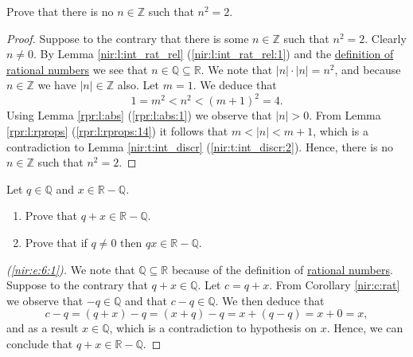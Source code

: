 \Newpage
\begin{exercise} %
	Prove that there is no $n \in \mathbb{Z}$ such that $n^{2} = 2$.
\end{exercise}

\begin{proof}
	Suppose to the contrary that there is some $n \in \mathbb{Z}$ such that $n^2 = 2$. Clearly $n \neq 0$. By Lemma \ref{nir:l:int_rat_rel} (\ref{nir:l:int_rat_rel:1}) and the \hyperref[nir:d:rat_irrat]{definition of rational numbers} we see that $n \in \mathbb{Q} \subseteq \mathbb{R}$. We note that $|n| \cdot |n| = n^2$, and because $n \in \mathbb{Z}$ we have $|n| \in \mathbb{Z}$ also. Let $m = 1$. We deduce that
	$$
		1 = m^2 < n^2 < (m + 1)^2 = 4.
	$$
	Using Lemma \ref{rpr:l:abs} (\ref{rpr:l:abs:1}) we observe that $|n| > 0$. From Lemma \ref{rpr:l:rprops} (\ref{rpr:l:rprops:14}) it follows that $m < |n| < m + 1$, which is a contradiction to Lemma \ref{nir:t:int_discr} (\ref{nir:t:int_discr:2}). Hence, there is no $n \in \mathbb{Z}$ such that $n^2 = 2$.
\end{proof}


\Newpage
\begin{exercise} %
	\label{nir:e:6}
	Let $q \in \mathbb{Q}$ and $x \in \mathbb{R} - \mathbb{Q}$.
	\begin{enumerate}
		\item \label{nir:e:6:1}
		      Prove that $q + x \in \mathbb{R} - \mathbb{Q}$.
		\item \label{nir:e:6:2}
		      Prove that if $q \neq 0$ then $q x \in \mathbb{R} - \mathbb{Q}$.
	\end{enumerate}
\end{exercise}

\begin{proof}[(\ref{nir:e:6:1})]
	We note that $\mathbb{Q} \subseteq \mathbb{R}$ because of the definition of \hyperref[nir:d:rat_irrat]{rational numbers}. Suppose to the contrary that $q + x \in \mathbb{Q}$. Let $c = q + x$. From Corollary \ref{nir:c:rat} we observe that $-q \in \mathbb{Q}$ and that $c - q \in \mathbb{Q}$. We then deduce that
	$$
		c - q = (q + x) - q = (x + q) - q = x + (q - q) = x + 0 = x,
	$$
	and as a result $x \in \mathbb{Q}$, which is a contradiction to hypothesis on $x$. Hence, we can conclude that ${q + x \in \mathbb{R} - \mathbb{Q}}$.
\end{proof}

